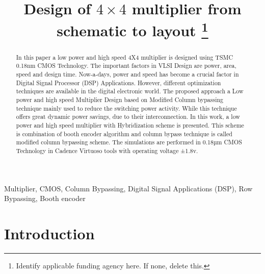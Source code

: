 \documentclass[conference]{IEEEtran}
\begin{document}
 
\title{Design of $4\times 4$ multiplier from schematic to layout
\thanks{Identify applicable funding agency here. If none, delete this.}
}

\author{
\and
{}
}

\maketitle

\begin{abstract}
    In this paper a low power and high speed 4X4 multiplier is designed using TSMC 0.18nm CMOS Technology. The important factors in VLSI Design are power, area, speed and design time. Now-a-days, power and speed has become a crucial factor in Digital Signal Processor (DSP) Applications. However, different optimization techniques are available in the digital electronic world. The proposed approach a Low power and high speed Multiplier Design based on Modified Column bypassing technique mainly used to reduce the switching power activity. While this technique offers great dynamic power savings, due to their interconnection. In this work, a low power and high speed multiplier with Hybridization scheme is presented. This scheme is combination of booth encoder algorithm and column bypass technique is called modified column bypassing scheme. The simulations are performed in 0.18µm CMOS Technology in Cadence Virtuoso tools with operating voltage ±1.8v.
\end{abstract}

\begin{IEEEkeywords}
    Multiplier, CMOS, Column Bypassing, Digital Signal Applications (DSP), Row Bypassing, Booth encoder
\end{IEEEkeywords}

\section{Introduction}
\end{document}
